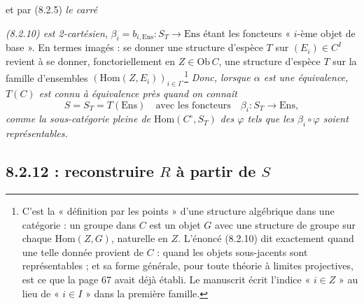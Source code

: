 \documentclass[11pt,a4paper]{article}
\begin{document}
et par (8.2.5) \emph{le carré}


\emph{(8.2.10) est 2-cartésien}, $\beta_{i} = b_{i,\mathrm{Ens}} : S_{T} \to
\mathrm{Ens}$ étant les foncteurs « $i$-ème objet de base ». En termes
imagés : se donner une structure d'espèce $T$ sur $(E_{i}) \in C^{I}$
revient à se donner, fonctoriellement en $Z \in \mathrm{Ob}\,C$, une
structure d'espèce $T$ sur la famille d'ensembles $(\mathrm{Hom}(Z,
E_{i}))_{i \in I}$.\footnote{C'est la « définition par les points » d'une
structure algébrique dans une catégorie : un groupe dans $C$ est un objet
$G$ avec une structure de groupe sur chaque $\mathrm{Hom}(Z, G)$,
naturelle en $Z$. L'énoncé (8.2.10) dit exactement quand une telle donnée
provient de $C$ : quand les objets sous-jacents sont représentables ; et
sa forme générale, pour toute théorie à limites projectives, est ce que la
page 67 avait déjà établi. Le manuscrit écrit l'indice « $i \in Z$ » au
lieu de « $i \in I$ » dans la première famille.} \emph{Donc, lorsque
$\alpha$ est une équivalence, $T(C)$ est connu à équivalence près quand on
connaît}
\begin{equation}
S = S_{T} = T(\mathrm{Ens}) \quad \text{avec les foncteurs} \quad
\beta_{i} : S_{T} \to \mathrm{Ens}, \tag{8.2.11}
\end{equation}
\emph{comme la sous-catégorie pleine de $\mathrm{Hom}(C^{\circ}, S_{T})$ des
$\varphi$ tels que les $\beta_{i} \circ \varphi$ soient représentables.}

\subsection*{8.2.12 : reconstruire $R$ à partir de $S$}
\end{document}
